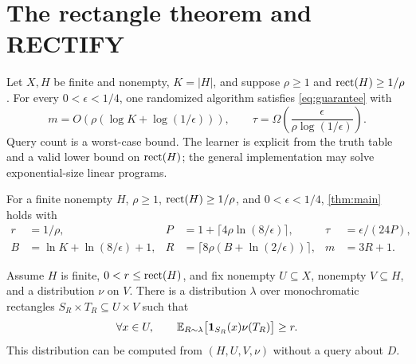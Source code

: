 \section{The rectangle theorem and RECTIFY}\label{sec:rectangle}
\begin{theorem}\label{thm:main}
Let $X,H$ be finite and nonempty, $K=|H|$, and suppose $\rho\ge1$ and $\operatorname{rect}(H)\ge1/\rho$. For every $0<\epsilon<1/4$, one randomized algorithm satisfies \eqref{eq:guarantee} with
\[
 m=O\!\left(\rho(\log K+\log(1/\epsilon))\right),\qquad
 \tau=\Omega\!\left(\frac{\epsilon}{\rho\log(1/\epsilon)}\right).
\]
Query count is a worst-case bound. The learner is explicit from the truth table and a valid lower bound on $\operatorname{rect}(H)$; the general implementation may solve exponential-size linear programs.
\end{theorem}
\begin{lemma}\label{lem:params}
For a finite nonempty $H$, $\rho\ge1$, $\operatorname{rect}(H)\ge1/\rho$, and $0<\epsilon<1/4$, \cref{thm:main} holds with
\begin{align}
 r&=1/\rho,&P&=1+\lceil4\rho\ln(8/\epsilon)\rceil,&\tau&=\epsilon/(24P),\label{eq:params1}\\
 B&=\ln K+\ln(8/\epsilon)+1,&R&=\lceil8\rho(B+\ln(2/\epsilon))\rceil,&m&=3R+1.\label{eq:params2}
\end{align}
\end{lemma}
\begin{lemma}\label{lem:mixture}
Assume $H$ is finite, $0<r\le\operatorname{rect}(H)$, and fix nonempty $U\subseteq X$, nonempty $V\subseteq H$, and a distribution $\nu$ on $V$. There is a distribution $\lambda$ over monochromatic rectangles $S_R\times T_R\subseteq U\times V$ such that
\begin{equation}\label{eq:coverage}
 \forall x\in U,\qquad
 \mathbb E_{R\sim\lambda}\bigl[\mathbf 1_{S_R}(x)\nu(T_R)\bigr]\ge r.
\end{equation}
This distribution can be computed from $(H,U,V,\nu)$ without a query about $D$.
\end{lemma}

